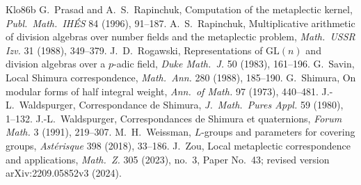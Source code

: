 \documentclass[12pt]{article}
\newcommand{\GL}{\mathrm{GL}}
\theoremstyle{plain}
\theoremstyle{definition}
\begin{document}
\begin{thebibliography}{Klo86b}
 G.~Prasad and A.~S.~Rapinchuk, Computation of the metaplectic kernel, \emph{Publ.\ Math.\ IH\'ES} 84 (1996), 91--187.
 A.~S.~Rapinchuk, Multiplicative arithmetic of division algebras over number fields and the metaplectic problem, \emph{Math.\ USSR Izv.} 31 (1988), 349--379.
 J.~D.~Rogawski, Representations of $\GL(n)$ and division algebras over a $p$-adic field, \emph{Duke Math.\ J.} 50 (1983), 161--196.
 G.~Savin, Local Shimura correspondence, \emph{Math.\ Ann.} 280 (1988), 185--190.
 G.~Shimura, On modular forms of half integral weight, \emph{Ann.\ of Math.} 97 (1973), 440--481.
 J.-L.~Waldspurger, Correspondance de Shimura, \emph{J.\ Math.\ Pures Appl.} 59 (1980), 1--132.
 J.-L.~Waldspurger, Correspondances de Shimura et quaternions, \emph{Forum Math.} 3 (1991), 219--307.
 M.~H.~Weissman, $L$-groups and parameters for covering groups, \emph{Ast\'erisque} 398 (2018), 33--186.
 J.~Zou, Local metaplectic correspondence and applications, \emph{Math.\ Z.} 305 (2023), no.~3, Paper No.~43; revised version arXiv:2209.05852v3 (2024).
\end{thebibliography}
\end{document}
